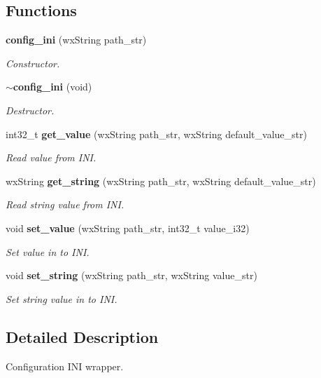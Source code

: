 \subsection*{Functions}
\begin{DoxyCompactItemize}
\item 
\textbf{ config\+\_\+ini} (wx\+String path\+\_\+str)
\begin{DoxyCompactList}\small\item\em Constructor. \end{DoxyCompactList}\item 
\textbf{ $\sim$config\+\_\+ini} (void)
\begin{DoxyCompactList}\small\item\em Destructor. \end{DoxyCompactList}\item 
int32\+\_\+t \textbf{ get\+\_\+value} (wx\+String path\+\_\+str, wx\+String default\+\_\+value\+\_\+str)
\begin{DoxyCompactList}\small\item\em Read value from I\+NI. \end{DoxyCompactList}\item 
wx\+String \textbf{ get\+\_\+string} (wx\+String path\+\_\+str, wx\+String default\+\_\+value\+\_\+str)
\begin{DoxyCompactList}\small\item\em Read string value from I\+NI. \end{DoxyCompactList}\item 
void \textbf{ set\+\_\+value} (wx\+String path\+\_\+str, int32\+\_\+t value\+\_\+i32)
\begin{DoxyCompactList}\small\item\em Set value in to I\+NI. \end{DoxyCompactList}\item 
void \textbf{ set\+\_\+string} (wx\+String path\+\_\+str, wx\+String value\+\_\+str)
\begin{DoxyCompactList}\small\item\em Set string value in to I\+NI. \end{DoxyCompactList}\end{DoxyCompactItemize}


\subsection{Detailed Description}
Configuration I\+NI wrapper. 




